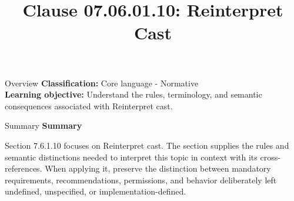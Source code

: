\documentclass[10pt,letterpaper]{article}
\title{Clause 07.06.01.10: Reinterpret Cast}
\author{}
\date{}
\begin{document}
\maketitle
\begin{CornellOverviewBox}{Overview}
\textbf{Classification:} Core language - Normative\\[2pt]
\textbf{Learning objective:} Understand the rules, terminology, and semantic consequences associated with Reinterpret cast.
\end{CornellOverviewBox}\begin{CornellSummaryBox}{Summary}
{\sffamily\bfseries\color{Accent} Summary}\par\vspace{3pt}Section 7.6.1.10 focuses on Reinterpret cast. The section supplies the rules and semantic distinctions needed to interpret this topic in context with its cross-references. When applying it, preserve the distinction between mandatory requirements, recommendations, permissions, and behavior deliberately left undefined, unspecified, or implementation-defined.
\end{CornellSummaryBox}
\end{document}

